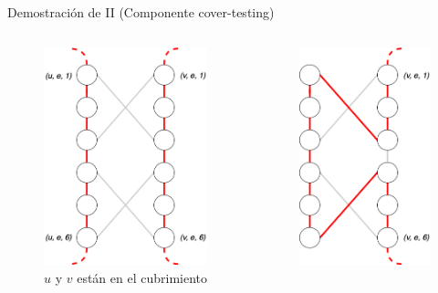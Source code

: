 \documentclass{beamer}
\begin{document}
\begin{frame}{Demostración de II (Componente cover-testing)}
\begin{columns}
        \begin{figure}
            \includegraphics[scale=0.2]{images/cover-testing-4.png}
            \caption{$u$ y $v$ están en el cubrimiento}
            \label{fig:my_label}
        \end{figure}
        \begin{figure}
            \centering
            \includegraphics[scale=0.2]{images/cover-testing-5.png}

\end{figure}
\end{columns}
\end{frame}
\end{document}
